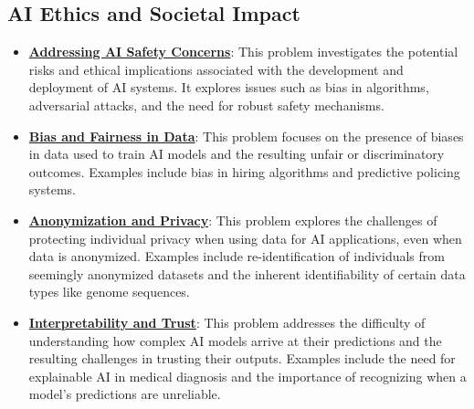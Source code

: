 \documentclass{article}%
\begin{document}
\subsection{AI Ethics and Societal Impact}%
\label{subsec:AIEthicsandSocietalImpact}%
\begin{itemize}[leftmargin=*]%
\item \href{https://purdue.brightspace.com/d2l/common/assets/pdfjs-d2l-dist/1.0.14-legacy/web/viewer.html?file=\%2Fcontent\%2Fenforced\%2F1095467-wl.202510.CS.24300.001\%2F02L2-Intro.pdf\%3Fou\%3D1095467\&lang=en-us\&container=d2l-fileviewer-rendered-pdf\&fullscreen=d2l-fileviewer-rendered-pdf-dialog\&height=667#page=19}{\textbf{Addressing AI Safety Concerns}}: This problem investigates the potential risks and ethical implications associated with the development and deployment of AI systems. It explores issues such as bias in algorithms, adversarial attacks, and the need for robust safety mechanisms.%
\item \href{https://purdue.brightspace.com/d2l/common/assets/pdfjs-d2l-dist/1.0.14-legacy/web/viewer.html?file=\%2Fcontent\%2Fenforced\%2F1095467-wl.202510.CS.24300.001\%2F16L2-ethics.pdf\%3Fou\%3D1095467\&lang=en-us\&container=d2l-fileviewer-rendered-pdf\&fullscreen=d2l-fileviewer-rendered-pdf-dialog\&height=667#page=2}{\textbf{Bias and Fairness in Data}}: This problem focuses on the presence of biases in data used to train AI models and the resulting unfair or discriminatory outcomes. Examples include bias in hiring algorithms and predictive policing systems.%
\item \href{https://purdue.brightspace.com/d2l/common/assets/pdfjs-d2l-dist/1.0.14-legacy/web/viewer.html?file=\%2Fcontent\%2Fenforced\%2F1095467-wl.202510.CS.24300.001\%2F16L2-ethics.pdf\%3Fou\%3D1095467\&lang=en-us\&container=d2l-fileviewer-rendered-pdf\&fullscreen=d2l-fileviewer-rendered-pdf-dialog\&height=667#page=10}{\textbf{Anonymization and Privacy}}: This problem explores the challenges of protecting individual privacy when using data for AI applications, even when data is anonymized. Examples include re-identification of individuals from seemingly anonymized datasets and the inherent identifiability of certain data types like genome sequences.%
\item \href{https://purdue.brightspace.com/d2l/common/assets/pdfjs-d2l-dist/1.0.14-legacy/web/viewer.html?file=\%2Fcontent\%2Fenforced\%2F1095467-wl.202510.CS.24300.001\%2F16L2-ethics.pdf\%3Fou\%3D1095467\&lang=en-us\&container=d2l-fileviewer-rendered-pdf\&fullscreen=d2l-fileviewer-rendered-pdf-dialog\&height=667#page=28}{\textbf{Interpretability and Trust}}: This problem addresses the difficulty of understanding how complex AI models arrive at their predictions and the resulting challenges in trusting their outputs. Examples include the need for explainable AI in medical diagnosis and the importance of recognizing when a model's predictions are unreliable.%

\end{itemize}
\end{document}
